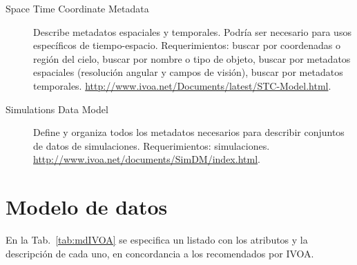 \begin{description}
	\item[Space Time Coordinate Metadata] Describe metadatos espaciales y temporales. Podría ser necesario para usos específicos de tiempo-espacio. Requerimientos: buscar por coordenadas o región del cielo, buscar por nombre o tipo de objeto, buscar por metadatos espaciales (resolución angular y campos de visión), buscar por metadatos temporales. \url{http://www.ivoa.net/Documents/latest/STC-Model.html}.
	\item[Simulations Data Model] Define y organiza todos los metadatos necesarios para describir conjuntos de datos de simulaciones. Requerimientos: simulaciones. \url{http://www.ivoa.net/documents/SimDM/index.html}.
\end{description}

\section{Modelo de datos}

En la Tab.~\ref{tab:mdIVOA} se especifica un listado con los atributos y la descripción de cada uno, en concordancia a los recomendados por IVOA.

